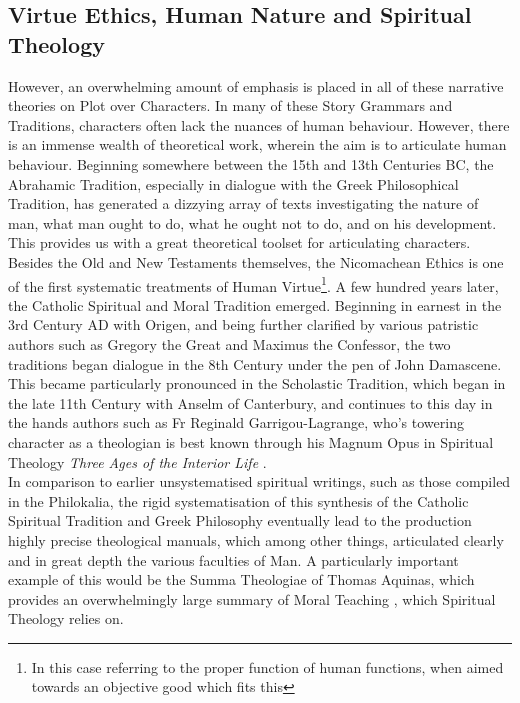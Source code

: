 \documentclass[11pt]{article}
\begin{document}
\subsection{Virtue Ethics, Human Nature and Spiritual Theology}
However, an overwhelming amount of emphasis is placed in all of these narrative theories on Plot over Characters. In many of these Story Grammars and Traditions, characters often lack the nuances of human behaviour. However, there is an immense wealth of theoretical work, wherein the aim is to articulate human behaviour. Beginning somewhere between the 15th and 13th Centuries BC, the Abrahamic Tradition, especially in dialogue with the Greek Philosophical Tradition, has generated a dizzying array of texts investigating the nature of man, what man ought to do, what he ought not to do, and on his development. This provides us with a great theoretical toolset for articulating characters. \\

Besides the Old and New Testaments themselves, the Nicomachean Ethics \cite{340BCEthicsAristotleNicomachean} is one of the first systematic treatments of Human Virtue\footnote{In this case referring to the proper function of human functions, when aimed towards an objective good which fits this}. A few hundred years later, the Catholic Spiritual and Moral Tradition emerged. Beginning in earnest in the 3rd Century AD with Origen\cite{bergsma2018catholic}, and being further clarified by various patristic authors such as Gregory the Great and Maximus the Confessor, the two traditions began dialogue in the 8th Century under the pen of John Damascene. This became particularly pronounced in the Scholastic Tradition, which began in the late 11th Century with Anselm of Canterbury, and continues to this day in the hands authors such as Fr Reginald Garrigou-Lagrange, who's towering character as a theologian is best known through his Magnum Opus in Spiritual Theology \: \textit{Three Ages of the Interior Life} \cite{garrigou2013three}. \\

In comparison to earlier unsystematised spiritual writings, such as those compiled in the Philokalia\cite{1983philokalia}, the rigid systematisation of this synthesis of the Catholic Spiritual Tradition and Greek Philosophy eventually lead to the production highly precise theological manuals, which among other things, articulated clearly and in great depth the various faculties of Man. A particularly important example of this would be the Summa Theologiae of Thomas Aquinas, which provides an overwhelmingly large summary of Moral Teaching \cite{aquinas2014summa}, which Spiritual Theology relies on.
\end{document}
